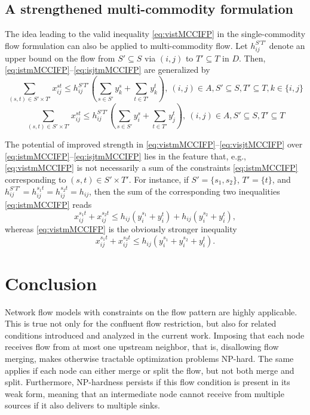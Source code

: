 \documentclass[pdflatex,sn-mathphys-num]{sn-jnl}%
\theoremstyle{thmstyleone}%
\begin{document}
\subsection{A strengthened multi-commodity formulation} \label{sec:vim}
The idea leading to the valid inequality \eqref{eq:vistMCCIFP} in the single-commodity flow formulation can also be applied to multi-commodity flow.
Let $h_{ij}^{S'T'}$ denote an upper bound on the flow from $S'\subseteq S$ via $(i,j)$ to $T'\subseteq T$ in $D$.
Then, \eqref{eq:istmMCCIFP}--\eqref{eq:isjtmMCCIFP} are generalized by
\begin{equation}
     \sum_{(s,t)\in S'\times T'}x_{ij}^{st}\leq h_{ij}^{S'T'}\left(\sum_{s\in S'}y_k^s+\sum_{t\in T'}y_k^t\right),
     ~(i,j)\in A, S'\subseteq S, T'\subseteq T, k\in\{i,j\} \label{eq:vistmMCCIFP}
\end{equation}
\begin{equation}
     \sum_{(s,t)\in S'\times T'}x_{ij}^{st}\leq h_{ij}^{S'T'}\left(\sum_{s\in S'}y_i^s+\sum_{t\in T'}y_j^t\right),
     ~(i,j)\in A, S'\subseteq S, T'\subseteq T \label{eq:visjtMCCIFP}
\end{equation}

The potential of improved strength in \eqref{eq:vistmMCCIFP}--\eqref{eq:visjtMCCIFP} over \eqref{eq:istmMCCIFP}--\eqref{eq:isjtmMCCIFP} lies in the feature that, e.g.,
\eqref{eq:vistmMCCIFP} is not necessarily a sum of the constraints \eqref{eq:istmMCCIFP} corresponding to $(s,t)\in S'\times T'$.
For instance, if $S'=\{s_1,s_2\}$, $T'=\{t\}$, and $h_{ij}^{S'T'}=h_{ij}^{s_1t}=h_{ij}^{s_2t}=h_{ij}$, then the sum of the corresponding two inequalities \eqref{eq:istmMCCIFP} reads
\[
x_{ij}^{s_1t}+x_{ij}^{s_2t}\leq h_{ij}(y_i^{s_1}+y_i^t) + h_{ij}(y_i^{s_2}+y_i^t),
\]
\noindent
whereas \eqref{eq:vistmMCCIFP} is the obviously stronger inequality
\[
x_{ij}^{s_1t}+x_{ij}^{s_2t}\leq h_{ij}(y_i^{s_1}+y_i^{s_2}+y_i^t).
\]

\section{Conclusion} \label{sec:conc}
Network flow models with constraints on the flow pattern are highly applicable.
This is true not only for the confluent flow restriction, but also for related conditions introduced and analyzed in the current work.
Imposing that each node receives flow from at most one upstream neighbor, that is, disallowing flow merging, makes otherwise tractable optimization problems NP-hard.
The same applies if each node can either merge or split the flow, but not both merge and split.
Furthermore, NP-hardness persists if this flow condition is present in its weak form, meaning that an intermediate node cannot receive from multiple sources if it also delivers to multiple sinks.
\end{document}
